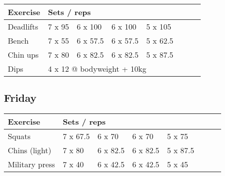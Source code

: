 \documentclass[12pt, a4paper]{article}%
\begin{document}
  \begin{tabular}{l|lllllll}
  \hspace{0.75em} \textbf{Exercise} & \multicolumn{ 7 }{l}{ \textbf{Sets / reps} } \\ \hline

            \hspace{0.75em} Deadlifts
            & 7 x 95
            & 6 x 100
            & 6 x 100
            & 5 x 105
            & 
            & 
            & 
            \\


            \hspace{0.75em} Bench
            & 7 x 55
            & 6 x 57.5
            & 6 x 57.5
            & 5 x 62.5
            & 
            & 
            & 
            \\


            \hspace{0.75em} Chin ups
            & 7 x 80
            & 6 x 82.5
            & 6 x 82.5
            & 5 x 87.5
            & 
            & 
            & 
            \\


   \hspace{0.75em} Dips &  \multicolumn{ 7 }{l}{ 4 x 12 @ bodyweight + 10kg } \\
  \end{tabular}

  \subsection*{\hspace{0.5em} Friday }


  \begin{tabular}{l|lllllll}
  \hspace{0.75em} \textbf{Exercise} & \multicolumn{ 7 }{l}{ \textbf{Sets / reps} } \\ \hline

            \hspace{0.75em} Squats
            & 7 x 67.5
            & 6 x 70
            & 6 x 70
            & 5 x 75
            & 
            & 
            & 
            \\


            \hspace{0.75em} Chins (light)
            & 7 x 80
            & 6 x 82.5
            & 6 x 82.5
            & 5 x 87.5
            & 
            & 
            & 
            \\


            \hspace{0.75em} Military press
            & 7 x 40
            & 6 x 42.5
            & 6 x 42.5
            & 5 x 45
            & 
            & 
            & 
            \\


  \end{tabular}
\end{document}
